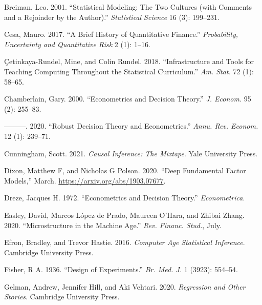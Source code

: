 \documentclass{article}
\newlength{\cslhangindent}
\newenvironment{CSLReferences}[2] %
 {%
  \setlength{\parindent}{0pt}
  \ifodd #1 \everypar{\setlength{\hangindent}{\cslhangindent}}\ignorespaces\fi
  \ifnum #2 > 0
  \setlength{\parskip}{#2\baselineskip}
  \fi
 }%
 {}
\begin{document}
\begin{CSLReferences}{1}{0}
\leavevmode{}%
Breiman, Leo. 2001. {``Statistical Modeling: The Two Cultures (with
Comments and a Rejoinder by the Author).''} \emph{Statistical Science}
16 (3): 199--231.

\leavevmode{}%
Cesa, Mauro. 2017. {``A Brief History of Quantitative Finance.''}
\emph{Probability, Uncertainty and Quantitative Risk} 2 (1): 1--16.

\leavevmode{}%
Çetinkaya-Rundel, Mine, and Colin Rundel. 2018. {``Infrastructure and
Tools for Teaching Computing Throughout the Statistical Curriculum.''}
\emph{Am. Stat.} 72 (1): 58--65.

\leavevmode{}%
Chamberlain, Gary. 2000. {``Econometrics and Decision Theory.''}
\emph{J. Econom.} 95 (2): 255--83.

\leavevmode{}%
---------. 2020. {``Robust Decision Theory and Econometrics.''}
\emph{Annu. Rev. Econom.} 12 (1): 239--71.

\leavevmode{}%
Cunningham, Scott. 2021. \emph{Causal Inference: The Mixtape}. Yale
University Press.

\leavevmode{}%
Dixon, Matthew F, and Nicholas G Polson. 2020. {``Deep Fundamental
Factor Models,''} March. \url{https://arxiv.org/abs/1903.07677}.

\leavevmode{}%
Dreze, Jacques H. 1972. {``Econometrics and Decision Theory.''}
\emph{Econometrica}.

\leavevmode{}%
Easley, David, Marcos López de Prado, Maureen O'Hara, and Zhibai Zhang.
2020. {``Microstructure in the Machine Age.''} \emph{Rev. Financ.
Stud.}, July.

\leavevmode{}%
Efron, Bradley, and Trevor Hastie. 2016. \emph{Computer Age Statistical
Inference}. Cambridge University Press.

\leavevmode{}%
Fisher, R A. 1936. {``Design of Experiments.''} \emph{Br. Med. J.} 1
(3923): 554--54.

\leavevmode{}%
Gelman, Andrew, Jennifer Hill, and Aki Vehtari. 2020. \emph{Regression
and Other Stories}. Cambridge University Press.


\end{CSLReferences}
\end{document}

